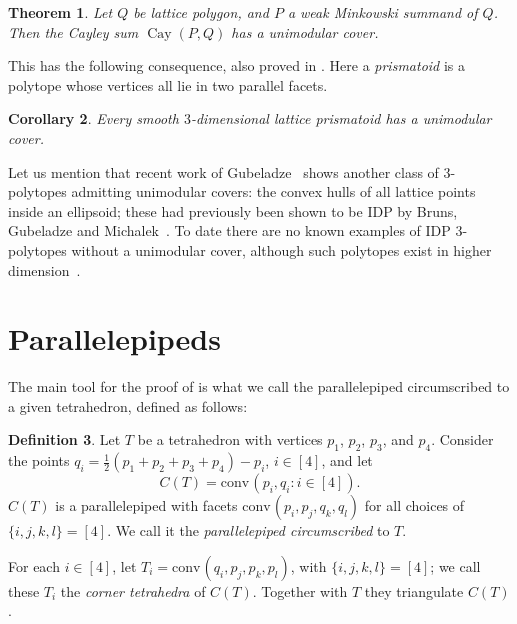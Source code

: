 \documentclass{amsart}
\theoremstyle{plain}
\newtheorem{theorem}{Theorem}[section]
\newtheorem{corollary}[theorem]{Corollary}
\theoremstyle{definition}
\newtheorem{definition}[theorem]{Definition}
\newcommand{\conv}{\ensuremath{\mathrm{conv}}\hspace{1pt}}
\newcommand{\cayley}{\operatorname{Cay}}
\begin{document}
\begin{theorem}
\label{thm:cayley}
Let $Q$ be lattice polygon, and $P$ a weak Minkowski summand of $Q$. Then the Cayley sum $\cayley(P,Q)$ has a unimodular cover.
\end{theorem}

This has the following consequence, also proved in .
Here a  \emph{prismatoid} is a polytope whose vertices all lie in two parallel facets. 


\begin{corollary}
\label{coro:prismatoid}
Every smooth $3$-dimensional lattice prismatoid has a unimodular cover.
\end{corollary}

Let us mention that recent work of Gubeladze~\cite{Gubeladze} shows another class of 3-polytopes admitting unimodular covers: the convex hulls of all lattice points inside an ellipsoid; these had previously been shown to be IDP by Bruns, Gubeladze and Michalek~\cite{BGM}.
To date there are no known examples of IDP $3$-polytopes without a unimodular cover, although such polytopes exist in higher dimension~\cite{BG}.




\section{Parallelepipeds}
\label{sec:parallelepipeds}

The main tool for the proof of  is what we call the parallelepiped circumscribed to a given tetrahedron, defined as follows:

\begin{definition}
\label{def:circunpara}
Let $T$ be a tetrahedron with vertices $p_1$, $p_2$, $p_3$, and $p_4$. Consider the points $q_i= \frac12 (p_1+p_2+p_3+p_4) - p_i$, $i\in [4]$, and let
\[
C(T)=\conv(p_i,q_i: i\in[4]).
\] 
$C(T)$ is a parallelepiped with facets $\conv(p_i, p_j, q_k, q_l)$ for all choices of $\{i,j,k,l\}=[4]$. We call it the \emph{parallelepiped circumscribed} to $T$.

For each $i \in [4]$, let $T_i=\conv(q_i, p_j, p_k, p_l)$, with $\{i,j,k,l\}=[4]$; we call these $T_i$ the \emph{corner tetrahedra} of $C(T)$. Together with $T$ they triangulate $C(T)$.
\end{definition}
\end{document}
